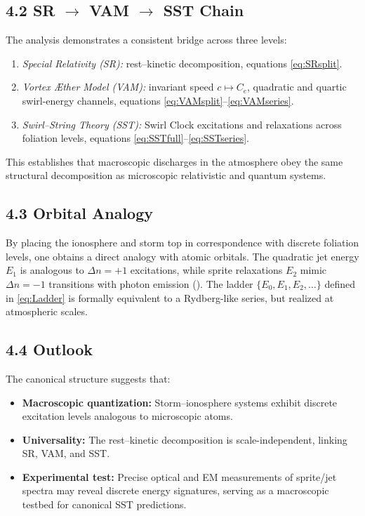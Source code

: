 \documentclass[11pt]{article}
\newcommand{\Ce}{C_{e}}
\begin{document}
\subsection*{4.2 SR $\to$ VAM $\to$ SST Chain}

    The analysis demonstrates a consistent bridge across three levels:

    \begin{enumerate}
    \item \emph{Special Relativity (SR):} rest--kinetic decomposition,
    equations \eqref{eq:SRsplit}.
    \item \emph{Vortex \AE ther Model (VAM):} invariant speed $c\mapsto \Ce$,
    quadratic and quartic swirl-energy channels,
    equations \eqref{eq:VAMsplit}--\eqref{eq:VAMseries}.
    \item \emph{Swirl--String Theory (SST):} Swirl Clock excitations and
    relaxations across foliation levels,
    equations \eqref{eq:SSTfull}--\eqref{eq:SSTseries}.
    \end{enumerate}

    This establishes that macroscopic discharges in the atmosphere
    obey the same structural decomposition as microscopic relativistic
    and quantum systems.

\subsection*{4.3 Orbital Analogy}

    By placing the ionosphere and storm top in correspondence with
    discrete foliation levels, one obtains a direct analogy with atomic
    orbitals. The quadratic jet energy $E_1$ is analogous to
    $\Delta n = +1$ excitations, while sprite relaxations $E_2$ mimic
    $\Delta n = -1$ transitions with photon emission
    (\cite{Bohr1913Hydrogen,Dirac1928Electron,BetheSalpeter1957}).
    The ladder $\{E_0,E_1,E_2,\dots\}$ defined in
    \eqref{eq:Ladder} is formally equivalent to a Rydberg-like
    series, but realized at atmospheric scales.

\subsection*{4.4 Outlook}

    The canonical structure suggests that:

    \begin{itemize}
    \item \textbf{Macroscopic quantization:} Storm--ionosphere systems
    exhibit discrete excitation levels analogous to microscopic atoms.
    \item \textbf{Universality:} The rest--kinetic decomposition is
    scale-independent, linking SR, VAM, and SST.
    \item \textbf{Experimental test:} Precise optical and EM measurements
    of sprite/jet spectra may reveal discrete energy signatures,
    serving as a macroscopic testbed for canonical SST predictions.
    \end{itemize}
\end{document}
